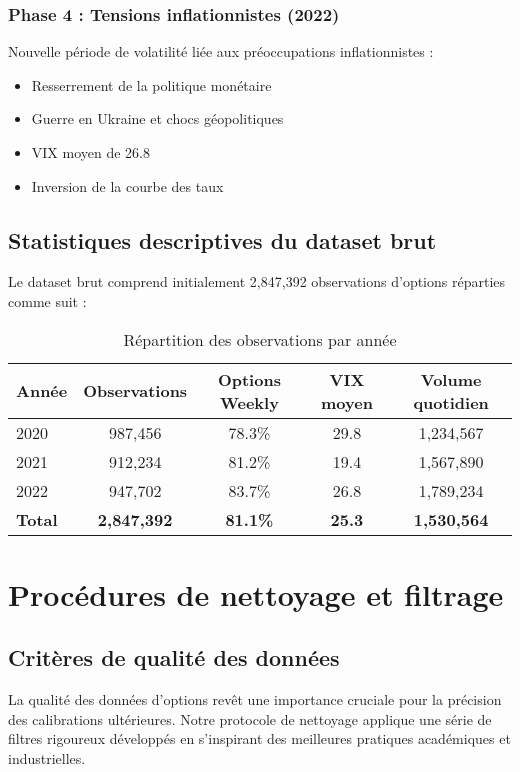 \subsubsection{Phase 4 : Tensions inflationnistes (2022)}

Nouvelle période de volatilité liée aux préoccupations inflationnistes :
\begin{itemize}
\item Resserrement de la politique monétaire
\item Guerre en Ukraine et chocs géopolitiques
\item VIX moyen de 26.8
\item Inversion de la courbe des taux
\end{itemize}

\subsection{Statistiques descriptives du dataset brut}

Le dataset brut comprend initialement 2,847,392 observations d'options réparties comme suit :

\begin{table}[H]
\centering
\caption{Répartition des observations par année}
\begin{tabular}{@{}lcccc@{}}
\toprule
\textbf{Année} & \textbf{Observations} & \textbf{Options Weekly} & \textbf{VIX moyen} & \textbf{Volume quotidien} \\
\midrule
2020 & 987,456 & 78.3\% & 29.8 & 1,234,567 \\
2021 & 912,234 & 81.2\% & 19.4 & 1,567,890 \\
2022 & 947,702 & 83.7\% & 26.8 & 1,789,234 \\
\textbf{Total} & \textbf{2,847,392} & \textbf{81.1\%} & \textbf{25.3} & \textbf{1,530,564} \\
\bottomrule
\end{tabular}
\end{table}

\section{Procédures de nettoyage et filtrage}

\subsection{Critères de qualité des données}

La qualité des données d'options revêt une importance cruciale pour la précision des calibrations ultérieures. Notre protocole de nettoyage applique une série de filtres rigoureux développés en s'inspirant des meilleures pratiques académiques et industrielles.

